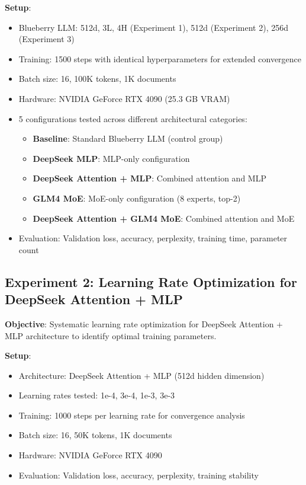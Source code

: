 \documentclass[11pt,a4paper]{article}
\begin{document}
\textbf{Setup}:
\begin{itemize}
    \item Blueberry LLM: 512d, 3L, 4H (Experiment 1), 512d (Experiment 2), 256d (Experiment 3)
    \item Training: 1500 steps with identical hyperparameters for extended convergence
    \item Batch size: 16, 100K tokens, 1K documents
    \item Hardware: NVIDIA GeForce RTX 4090 (25.3 GB VRAM)
    \item 5 configurations tested across different architectural categories:
    \begin{itemize}
        \item \textbf{Baseline}: Standard Blueberry LLM (control group)
        \item \textbf{DeepSeek MLP}: MLP-only configuration
        \item \textbf{DeepSeek Attention + MLP}: Combined attention and MLP
        \item \textbf{GLM4 MoE}: MoE-only configuration (8 experts, top-2)
        \item \textbf{DeepSeek Attention + GLM4 MoE}: Combined attention and MoE
    \end{itemize}
    \item Evaluation: Validation loss, accuracy, perplexity, training time, parameter count
\end{itemize}

\subsection{Experiment 2: Learning Rate Optimization for DeepSeek Attention + MLP}

\textbf{Objective}: Systematic learning rate optimization for DeepSeek Attention + MLP architecture to identify optimal training parameters.

\textbf{Setup}:
\begin{itemize}
    \item Architecture: DeepSeek Attention + MLP (512d hidden dimension)
    \item Learning rates tested: 1e-4, 3e-4, 1e-3, 3e-3
    \item Training: 1000 steps per learning rate for convergence analysis
    \item Batch size: 16, 50K tokens, 1K documents
    \item Hardware: NVIDIA GeForce RTX 4090
    \item Evaluation: Validation loss, accuracy, perplexity, training stability
\end{itemize}
\end{document}
